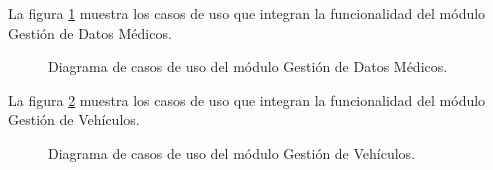 La figura \ref{fig:casosUso:Medi} muestra los casos de uso que integran la funcionalidad del módulo Gestión de Datos Médicos.

\begin{figure}[htpb!]
	\begin{center}
		\caption{Diagrama de casos de uso del módulo Gestión de Datos Médicos. \label{fig:casosUso:Medi}}
	\end{center}
\end{figure}

La figura \ref{fig:casosUso:Vehi} muestra los casos de uso que integran la funcionalidad del módulo Gestión de Vehículos.

\begin{figure}[htpb!]
	\begin{center}
		\caption{Diagrama de casos de uso del módulo Gestión de Vehículos. \label{fig:casosUso:Vehi}}
	\end{center}
\end{figure}

